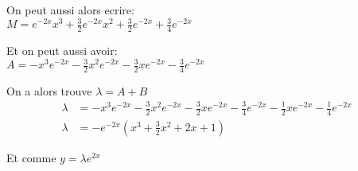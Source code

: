 On peut aussi alors ecrire: \\
$M = e^{-2x}x^3 + \frac{3}{2}e^{-2x}x^2 + \frac{3}{2} e^{-2x} + \frac{3}{4}e^{-2x}$

Et on peut aussi avoir: \\
$A = -x^3e^{-2x} -\frac{3}{2}x^2e^{-2x} - \frac{3}{2}xe^{-2x} - \frac{3}{4}e^{-2x}$

On a alors trouve $\lambda = A + B$ \\
\begin{align*}
	\lambda &= -x^3e^{-2x} -\frac{3}{2}x^2e^{-2x} - \frac{3}{2}xe^{-2x} - \frac{3}{4}e^{-2x} -\frac{1}{2}xe^{-2x} - \frac{1}{4} e^{-2x} \\
	\lambda &= -e^{-2x}(x^3 + \frac{3}{2}x^2 +2x +1)
\end{align*}

Et comme $y = \lambda e^{2x}$ \\
